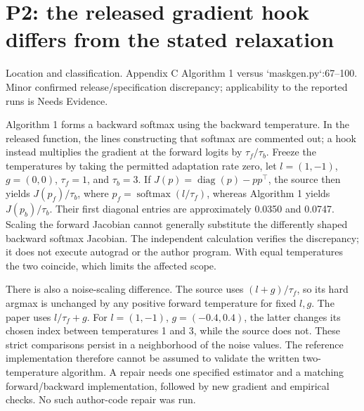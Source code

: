 \documentclass[10pt]{article}
\begin{document}
\section*{P2: the released gradient hook differs from the stated relaxation}
Location and classification. Appendix C Algorithm 1 versus `maskgen.py`:67–100. Minor confirmed release/specification discrepancy; applicability to the reported runs is Needs Evidence.\par
Algorithm 1 forms a backward softmax using the backward temperature. In the released function, the lines constructing that softmax are commented out; a hook instead multiplies the gradient at the forward logits by \(\tau_f/\tau_b\). Freeze the temperatures by taking the permitted adaptation rate zero, let \(l=(1,-1)\), \(g=(0,0)\), \(\tau_f=1\), and \(\tau_b=3\). If \(J(p)=\operatorname{diag}(p)-pp^\top\), the source then yields \(J(p_f)/\tau_b\), where \(p_f=\operatorname{softmax}(l/\tau_f)\), whereas Algorithm 1 yields \(J(p_b)/\tau_b\). Their first diagonal entries are approximately 0.0350 and 0.0747. Scaling the forward Jacobian cannot generally substitute the differently shaped backward softmax Jacobian. The independent calculation verifies the discrepancy; it does not execute autograd or the author program. With equal temperatures the two coincide, which limits the affected scope.\par
There is also a noise-scaling difference. The source uses \((l+g)/\tau_f\), so its hard argmax is unchanged by any positive forward temperature for fixed \(l,g\). The paper uses \(l/\tau_f+g\). For \(l=(1,-1)\), \(g=(-0.4,0.4)\), the latter changes its chosen index between temperatures 1 and 3, while the source does not. These strict comparisons persist in a neighborhood of the noise values. The reference implementation therefore cannot be assumed to validate the written two-temperature algorithm. A repair needs one specified estimator and a matching forward/backward implementation, followed by new gradient and empirical checks. No such author-code repair was run.\par
\end{document}
